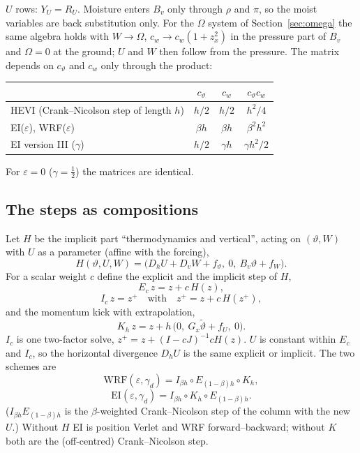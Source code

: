 \documentclass[11pt,a4paper]{article}
\newcommand{\tv}{\vartheta}   %
\begin{document}
$U$ rows: $Y_U=R_U$. Moisture enters $B_v$ only through $\rho$ and $\pi$, so the moist variables are back
substitution only. For the $\Omega$ system of Section~\ref{sec:omega} the same algebra holds with $W\to\Omega$, $c_w\to c_w(1+z_x^2)$
in the pressure part of $B_v$ and $\Omega=0$ at the ground; $U$ and $W$ then follow from the pressure. The matrix depends on $c_\tv$ and $c_w$ only through
the product:
\begin{center}\small
\begin{tabular}{lccc}\toprule
& $c_\tv$ & $c_w$ & $c_\tv c_w$\\\midrule
HEVI (Crank--Nicolson step of length $h$) & $h/2$ & $h/2$ & $h^2/4$\\
EI($\varepsilon$), WRF($\varepsilon$) & $\beta h$ & $\beta h$ & $\beta^2h^2$\\
EI version III ($\gamma$) & $h/2$ & $\gamma h$ & $\gamma h^2/2$\\\bottomrule
\end{tabular}
\end{center}
For $\varepsilon=0$ ($\gamma=\tfrac12$) the matrices are identical.

\subsection{The steps as compositions}
Let $H$ be the implicit part ``thermodynamics and vertical'', acting on $(\tv,W)$ with $U$ as a parameter
(affine with the forcing),
\[
H(\tv,U,W)=\big(D_hU+D_vW+f_\tv,\ 0,\ B_v\tv+f_W\big).
\]
For a scalar weight $c$ define the explicit and the implicit step of $H$,
\[
E_c\,z=z+c\,H(z),
\]
\[
I_c\,z=z^+\quad\text{with}\quad z^+=z+c\,H(z^+),
\]
and the momentum kick with extrapolation,
\[
K_h\,z=z+h\,\big(0,\ G_x\tilde\tv+f_U,\ 0\big).
\]
$I_c$ is one two-factor solve, $z^+=z+(I-cJ)^{-1}cH(z)$. $U$ is constant within $E_c$ and $I_c$, so the horizontal
divergence $D_hU$ is the same explicit or implicit. The two schemes are
\[
\text{WRF}(\varepsilon,\gamma_d)=I_{\beta h}\circ E_{(1-\beta)h}\circ K_h ,
\]
\[
\text{EI}(\varepsilon,\gamma_d)=I_{\beta h}\circ K_h\circ E_{(1-\beta)h} .
\]
($I_{\beta h}E_{(1-\beta)h}$ is the $\beta$-weighted Crank--Nicolson step of the column with the new $U$.) Without $H$ EI is
position Verlet and WRF forward--backward; without $K$ both are the (off-centred) Crank--Nicolson step.
\end{document}
